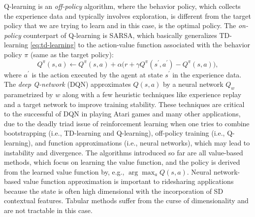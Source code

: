 \documentclass{article}
\begin{document}
Q-learning is an \emph{off-policy} algorithm, where the behavior policy, which collects the experience data and typically involves exploration, is different from the target policy that we are trying to learn and in this case, is the optimal policy. The \emph{on-policy} counterpart of Q-learning is SARSA, which basically generalizes TD-learning \eqref{eq:td-learning} to the action-value function associated with the behavior policy $\pi$ (same as the target policy):
\begin{equation}
    Q^\pi(s,a) \leftarrow Q^\pi(s,a) + \alpha\bigg(r + \gamma Q^\pi(s^\prime,a^\prime) - Q^\pi(s,a)\bigg),
\end{equation}
where $a^\prime$ is the action executed by the agent at state $s^\prime$ in the experience data.
The \emph{deep Q-network} (DQN) \citep{mnih2015human} approximates $Q(s,a)$ by a neural network $Q_w$ parametrized by $w$ along with a few heuristic techniques like experience replay \citep{lin1992self} and a target network to improve training stability. These techniques are critical to the successful of DQN in playing Atari games and many other applications, due to the deadly triad issue \citep{sutton2018reinforcement} of reinforcement learning when one tries to combine bootstrapping (i.e., TD-learning and Q-learning), off-policy training (i.e., Q-learning), and function approximations (i.e., neural networks), which may lead to instability and divergence.
The algorithms introduced so far are all value-based methods, which focus on learning the value function, and the policy is derived from the learned value function by, e.g., $\arg\max_a Q(s,a)$. Neural network-based value function approximation is important to ridesharing applications because the state is often high dimensional with the incorporation of SD contextual features. Tabular methods suffer from the curse of dimensionality and are not tractable in this case.
\end{document}
